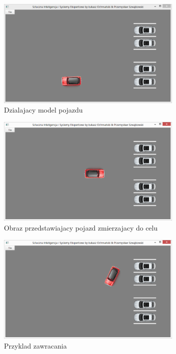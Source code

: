 \documentclass{classrep}
\begin{document}
\begin{figure}[ht]
\centering
	\includegraphics[width=0.8\textwidth,natwidth=610,natheight=642]{pictures/Obraz10.png}
	\caption{Dzialajacy model pojazdu}
	\label{fig:Dzialajacy model pojazdu}
\end{figure}

\begin{figure}[ht]
\centering
	\includegraphics[width=0.8\textwidth,natwidth=610,natheight=642]{pictures/Obraz11.png}
	\caption{Obraz przedstawiajacy pojazd zmierzajacy do celu}
	\label{fig:Obraz przedstawiajacy pojazd zmierzajacy do celu}
\end{figure}

\begin{figure}[ht]
\centering
	\includegraphics[width=0.8\textwidth,natwidth=610,natheight=642]{pictures/Obraz12.png}
	\caption{Przyklad zawracania}
	\label{fig:Przyklad zawracania}
\end{figure}
\end{document}
